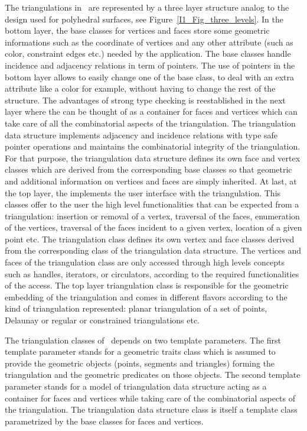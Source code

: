 The triangulations in \cgal\ are represented
by a three layer structure  analog to the design used for polyhedral
surfaces, see Figure~\ref{I1_Fig_three_levels}.
In the bottom layer, the base classes for vertices and faces
store some 
geometric informations such as the coordinate of vertices 
and any other attribute (such as color, constraint edges etc.)
needed by the application.
The base classes handle
incidence and adjacency relations in term of  pointers.
The use of  pointers in the bottom layer allows 
to easily change one of the base
class, to deal with an extra attribute like a color for example,
without having to change the rest of the structure. 
The advantages of strong type 
checking is reestablished in the next layer 
where the  can be thought 
of as a container for faces and vertices which can take care
of all the combinatorial aspects of the triangulation.
The {triangulation data structure}
implements
adjacency and incidence relations with type safe pointer operations
and maintains the combinatorial integrity of the triangulation.
For that purpose, the {triangulation data structure} defines its own face and vertex
classes which are derived
 from the corresponding 
base classes
so that geometric and additional information on vertices and faces 
are simply inherited.
  At last, at the top layer, the 
implements the user interface with the triangulation. 
This classes offer to the user
the high level functionalities that can be expected from a triangulation:
insertion  or removal of a vertex, traversal of the faces,
enumeration of the vertices,
traversal of the   faces incident to a given vertex, location of a given point etc.
The {triangulation class} defines its own 
vertex and face classes
derived from the corresponding class of the {triangulation data structure}.
The vertices and faces of the {triangulation class}
are only accessed through high levels concepts such as 
handles, iterators, or circulators,
according to the required functionalities of the access.
The top layer {triangulation class}
is responsible for the geometric embedding of the triangulation
and comes in different flavors according to the kind of triangulation represented:
planar triangulation of a set of points, Delaunay or regular or constrained
 triangulations etc.

The triangulation classes of \cgal\ depends on two template parameters.
The first template parameter stands for
 a geometric traits class which is assumed to provide
the geometric objects (points, segments and triangles) 
forming  the triangulation and the geometric predicates on those objects.
The second template parameter stands for a model
of  triangulation data
structure acting as a container for faces and vertices
while  taking care of the combinatorial aspects of the triangulation. 
The triangulation data structure class is itself a template
class parametrized by the base classes for faces and vertices.


